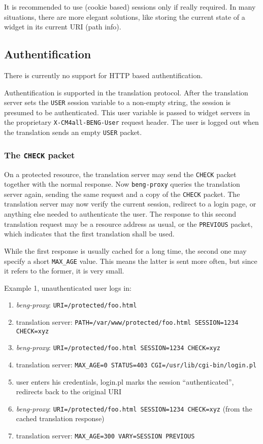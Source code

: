 \documentclass[a4paper,12pt]{article}
\begin{document}
It is recommended to use (cookie based) sessions only if really
required.  In many situations, there are more elegant solutions, like
storing the current state of a widget in its current URI (path info).

\subsection{Authentification}
\label{authentification}

There is currently no support for HTTP based authentification.

Authentification is supported in the translation protocol.  After the
translation server sets the \verb|USER| session variable to a
non-empty string, the session is presumed to be authenticated.  This
user variable is passed to widget servers in the proprietary
\texttt{X-CM4all-BENG-User} request header.  The user is logged out
when the translation sends an empty \verb|USER| packet.

\subsubsection{The \texttt{CHECK} packet}

On a protected resource, the translation server may send the
\verb|CHECK| packet together with the normal response.  Now
\texttt{beng-proxy} queries the translation server again, sending the
same request and a copy of the \verb|CHECK| packet.  The translation
server may now verify the current session, redirect to a login page,
or anything else needed to authenticate the user.  The response to
this second translation request may be a resource address as usual, or
the \verb|PREVIOUS| packet, which indicates that the first
translation shall be used.

While the first response is usually cached for a long time, the second
one may specify a short \texttt{MAX\_AGE} value.  This means the latter
is sent more often, but since it refers to the former, it is very
small.

Example 1, unauthenticated user logs in:

\begin{enumerate}
\item \emph{beng-proxy}: \texttt{URI=/protected/foo.html}
\item translation server: \texttt{PATH=/var/www/protected/foo.html
  SESSION=1234 CHECK=xyz}
\item \emph{beng-proxy}: \texttt{URI=/protected/foo.html SESSION=1234
  CHECK=xyz}
\item translation server: \texttt{MAX\_AGE=0 STATUS=403
  CGI=/usr/lib/cgi-bin/login.pl}
\item user enters his credentials, login.pl marks the session
  ``authenticated'', redirects back to the original URI
\item \emph{beng-proxy}: \texttt{URI=/protected/foo.html SESSION=1234
  CHECK=xyz} (from the cached translation response)
\item translation server: \texttt{MAX\_AGE=300 VARY=SESSION PREVIOUS}
\end{enumerate}
\end{document}
